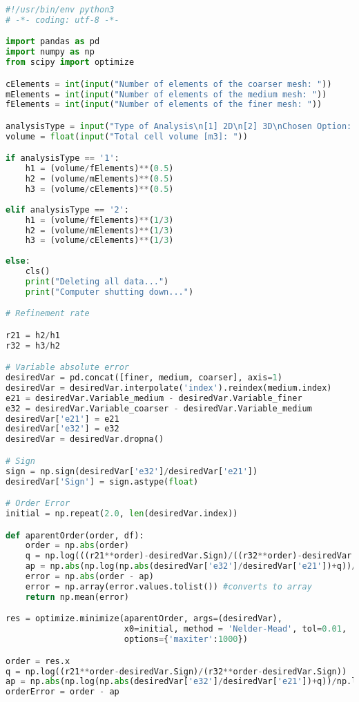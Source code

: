 \documentclass[../main.tex]{subfiles}
\begin{document}
\begin{lstlisting}[language=python]
#!/usr/bin/env python3
# -*- coding: utf-8 -*-

import pandas as pd
import numpy as np
from scipy import optimize

cElements = int(input("Number of elements of the coarser mesh: "))
mElements = int(input("Number of elements of the medium mesh: "))
fElements = int(input("Number of elements of the finer mesh: "))

analysisType = input("Type of Analysis\n[1] 2D\n[2] 3D\nChosen Option: ")
volume = float(input("Total cell volume [m3]: "))

if analysisType == '1':
	h1 = (volume/fElements)**(0.5)
	h2 = (volume/mElements)**(0.5)
	h3 = (volume/cElements)**(0.5)
	
elif analysisType == '2':
	h1 = (volume/fElements)**(1/3)
	h2 = (volume/mElements)**(1/3)
	h3 = (volume/cElements)**(1/3)
	
else:
	cls()
	print("Deleting all data...")
	print("Computer shutting down...")

# Refinement rate

r21 = h2/h1
r32 = h3/h2

# Variable absolute error
desiredVar = pd.concat([finer, medium, coarser], axis=1)
desiredVar = desiredVar.interpolate('index').reindex(medium.index)
e21 = desiredVar.Variable_medium - desiredVar.Variable_finer
e32 = desiredVar.Variable_coarser - desiredVar.Variable_medium
desiredVar['e21'] = e21
desiredVar['e32'] = e32
desiredVar = desiredVar.dropna()

# Sign
sign = np.sign(desiredVar['e32']/desiredVar['e21'])
desiredVar['Sign'] = sign.astype(float)

# Order Error
initial = np.repeat(2.0, len(desiredVar.index))

def aparentOrder(order, df):
    order = np.abs(order)
    q = np.log(((r21**order)-desiredVar.Sign)/((r32**order)-desiredVar.Sign))
    ap = np.abs(np.log(np.abs(desiredVar['e32']/desiredVar['e21'])+q))/np.log(r21)
    error = np.abs(order - ap)
    error = np.array(error.values.tolist()) #converts to array
    return np.mean(error)

res = optimize.minimize(aparentOrder, args=(desiredVar),
                        x0=initial, method = 'Nelder-Mead', tol=0.01,
                        options={'maxiter':1000})

order = res.x
q = np.log((r21**order-desiredVar.Sign)/(r32**order-desiredVar.Sign))
ap = np.abs(np.log(np.abs(desiredVar['e32']/desiredVar['e21'])+q))/np.log(r21)
orderError = order - ap


\end{lstlisting}
\end{document}
